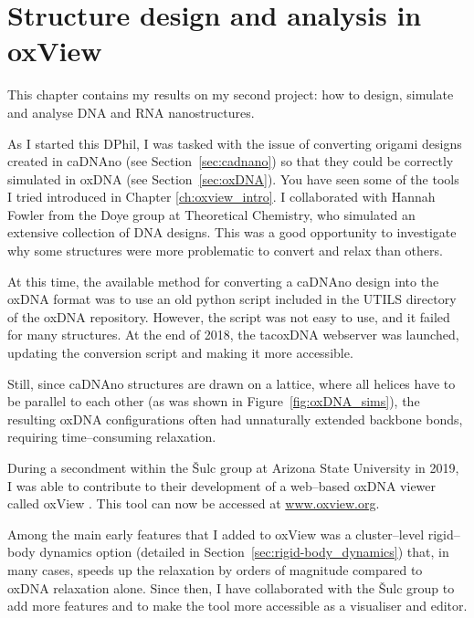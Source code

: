 \chapter{\label{ch:oxview}Structure design and analysis in oxView}

\minitoc

This chapter contains my results on my second project: how to design, simulate and analyse DNA and RNA nanostructures. 


As I started this DPhil, I was tasked with the issue of converting origami designs created in caDNAno (see Section~\ref{sec:cadnano}) so that they could be correctly simulated in oxDNA (see Section~\ref{sec:oxDNA}). You have seen some of the tools I tried introduced in Chapter \ref{ch:oxview_intro}. I collaborated with Hannah Fowler from the Doye group at Theoretical Chemistry, who simulated an extensive collection of DNA designs. This was a good opportunity to investigate why some structures were more problematic to convert and relax than others.

At this time, the available method for converting a caDNAno design into the oxDNA format was to use an old python script included in the UTILS directory of the oxDNA repository. However, the script was not easy to use, and it failed for many structures. At the end of 2018, the tacoxDNA webserver \cite{suma2019tacoxdna} was launched, updating the conversion script and making it more accessible.

Still, since caDNAno structures are drawn on a lattice, where all helices have to be parallel to each other (as was shown in Figure~\ref{fig:oxDNA_sims}), the resulting oxDNA configurations often had unnaturally extended backbone bonds, requiring time--consuming relaxation.

During a secondment within the {\v{S}}ulc group at Arizona State University in 2019, I was able to contribute to their development of a web--based oxDNA viewer called oxView \cite{poppleton2020design, bohlin2022oxview}. This tool can now be accessed at {\large\url{www.oxview.org}}.

Among the main early features that I added to oxView was a cluster--level rigid--body dynamics option (detailed in Section~\ref{sec:rigid-body_dynamics}) that, in many cases, speeds up the relaxation by orders of magnitude compared to oxDNA relaxation alone. Since then, I have collaborated with the {\v{S}}ulc group to add more features and to make the tool more accessible as a visualiser and editor. 

